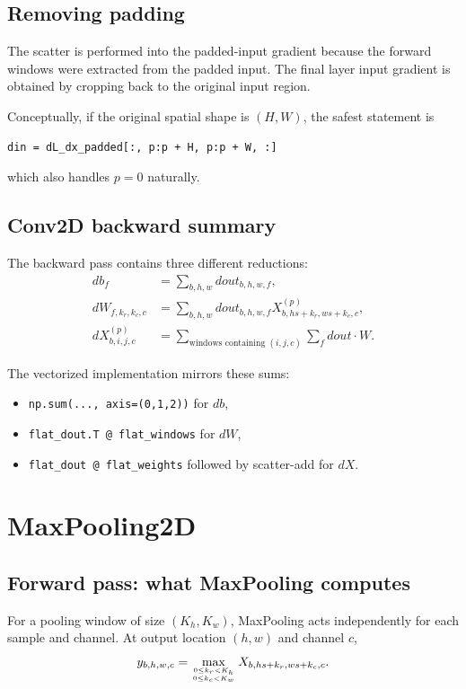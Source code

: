 \documentclass[11pt,a4paper]{article}
\newcommand{\code}[1]{\texttt{#1}}
\begin{document}
\subsection{Removing padding}

The scatter is performed into the padded-input gradient because the forward windows were extracted from the padded input. The final layer input gradient is obtained by cropping back to the original input region.

Conceptually, if the original spatial shape is $(H,W)$, the safest statement is
\begin{lstlisting}
din = dL_dx_padded[:, p:p + H, p:p + W, :]
\end{lstlisting}
which also handles $p=0$ naturally.

\subsection{Conv2D backward summary}

The backward pass contains three different reductions:
\begin{align*}
db_f
&=
\sum_{b,h,w}dout_{b,h,w,f},\\

dW_{f,k_r,k_c,c}
&=
\sum_{b,h,w}
dout_{b,h,w,f}
X^{(p)}_{b,hs+k_r,ws+k_c,c},\\

dX^{(p)}_{b,i,j,c}
&=
\sum_{\text{windows containing }(i,j,c)}
\sum_f dout\cdot W.
\end{align*}

The vectorized implementation mirrors these sums:
\begin{itemize}
    \item \code{np.sum(..., axis=(0,1,2))} for $db$,
    \item \code{flat\_dout.T @ flat\_windows} for $dW$,
    \item \code{flat\_dout @ flat\_weights} followed by scatter-add for $dX$.
\end{itemize}

\newpage
\section{MaxPooling2D}

\subsection{Forward pass: what MaxPooling computes}

For a pooling window of size $(K_h,K_w)$, MaxPooling acts independently for each sample and channel. At output location $(h,w)$ and channel $c$,
\[
y_{b,h,w,c}
=
\max_{0\le k_r<K_h\atop 0\le k_c<K_w}
X_{b,hs+k_r,ws+k_c,c}.
\]
\end{document}
